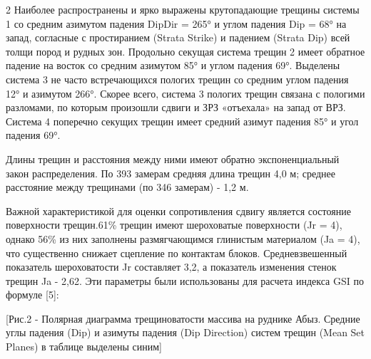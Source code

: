 \begin{multicols}{2}
Наиболее распространены и ярко выражены крутопадающие трещины системы 1
со средним азимутом падения DipDir = 265° и углом падения Dip = 68° на
запад, согласные с простиранием (Strata Strike) и падением (Strata Dip)
всей толщи пород и рудных зон. Продольно секущая система трещин 2 имеет
обратное падение на восток со средним азимутом 85° и углом падения 69°.
Выделены система 3 не часто встречающихся пологих трещин со средним
углом падения 12° и азимутом 266°. Скорее всего, система 3 пологих
трещин связана с пологими разломами, по которым произошли сдвиги и ЗРЗ
«отъехала» на запад от ВРЗ. Система 4 поперечно секущих трещин имеет
средний азимут падения 85° и угол падения 69°.

Длины трещин и расстояния между ними имеют обратно экспоненциальный
закон распределения. По 393 замерам средняя длина трещин 4,0 м; среднее
расстояние между трещинами (по 346 замерам) - 1,2 м.

Важной характеристикой для оценки сопротивления сдвигу является
состояние поверхности трещин.61\% трещин имеют шероховатые поверхности
(Jr = 4), однако 56\% из них заполнены размягчающимся глинистым
материалом (Ja = 4), что существенно снижает сцепление по контактам
блоков. Средневзвешенный показатель шероховатости Jr составляет 3,2, а
показатель изменения стенок трещин Ja - 2,62. Эти параметры были
использованы для расчета индекса GSI по формуле {[}5{]}:
\end{multicols}

[Рис.2 - Полярная диаграмма трещиноватости массива на
руднике Абыз.  Средние углы падения (Dip) и азимуты падения (Dip
Direction) систем трещин (Mean Set Planes) в таблице выделены синим]
\begin{figs}
\end{figs}


